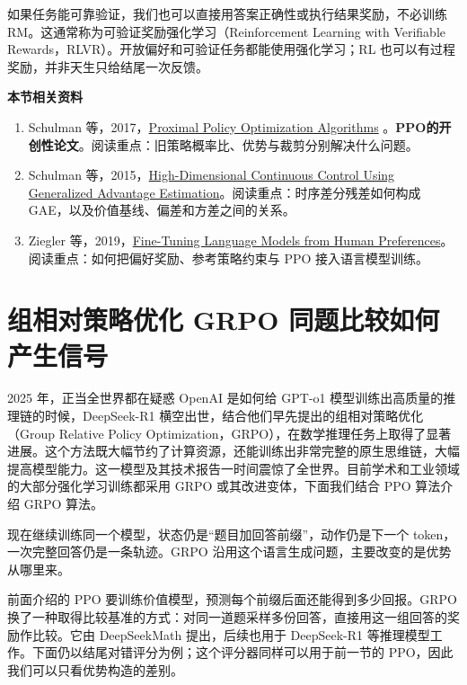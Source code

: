 如果任务能可靠验证，我们也可以直接用答案正确性或执行结果奖励，不必训练 RM。这通常称为可验证奖励强化学习（Reinforcement Learning with Verifiable Rewards，RLVR）。开放偏好和可验证任务都能使用强化学习；RL 也可以有过程奖励，并非天生只给结尾一次反馈。

\textbf{本节相关资料}
\begin{enumerate}
    \item Schulman 等，2017，\href{https://arxiv.org/abs/1707.06347}{Proximal Policy Optimization Algorithms} 。\textbf{PPO的开创性论文}。阅读重点：旧策略概率比、优势与裁剪分别解决什么问题。
    \item Schulman 等，2015，\href{https://arxiv.org/abs/1506.02438}{High-Dimensional Continuous Control Using Generalized Advantage Estimation}。阅读重点：时序差分残差如何构成 GAE，以及价值基线、偏差和方差之间的关系。
    \item Ziegler 等，2019，\href{https://arxiv.org/abs/1909.08593}{Fine-Tuning Language Models from Human Preferences}。阅读重点：如何把偏好奖励、参考策略约束与 PPO 接入语言模型训练。
\end{enumerate}

\section{组相对策略优化 GRPO 同题比较如何产生信号}\label{组相对策略优化 GRPO 同题比较如何产生信号}

2025 年，正当全世界都在疑惑 OpenAI 是如何给 GPT-o1 模型训练出高质量的推理链的时候，DeepSeek-R1 横空出世，结合他们早先提出的组相对策略优化（Group Relative Policy Optimization，GRPO），在数学推理任务上取得了显著进展。这个方法既大幅节约了计算资源，还能训练出非常完整的原生思维链，大幅提高模型能力。这一模型及其技术报告一时间震惊了全世界。目前学术和工业领域的大部分强化学习训练都采用 GRPO 或其改进变体，下面我们结合 PPO 算法介绍 GRPO 算法。

现在继续训练同一个模型，状态仍是``题目加回答前缀''，动作仍是下一个 token，一次完整回答仍是一条轨迹。GRPO 沿用这个语言生成问题，主要改变的是优势从哪里来。

前面介绍的 PPO 要训练价值模型，预测每个前缀后面还能得到多少回报。GRPO 换了一种取得比较基准的方式：对同一道题采样多份回答，直接用这一组回答的奖励作比较。它由 DeepSeekMath 提出，后续也用于 DeepSeek-R1 等推理模型工作。下面仍以结尾对错评分为例；这个评分器同样可以用于前一节的 PPO，因此我们可以只看优势构造的差别。

